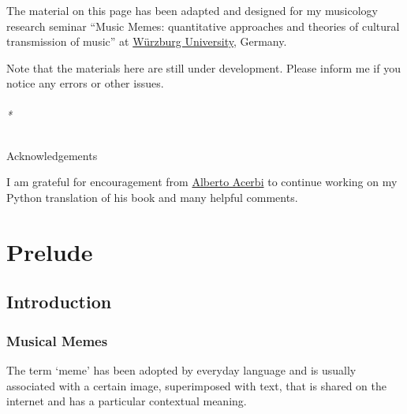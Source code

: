 \documentclass[
  a4paperpaper,
  ,captions=tableheading
]{scrbook}
\let\oldparagraph\paragraph
\renewcommand{\paragraph}[1]{\oldparagraph{#1}\mbox{}}
\begin{document}
\begin{tcolorbox}[enhanced jigsaw, arc=.35mm, colbacktitle=quarto-callout-important-color!10!white, colback=white, breakable, toprule=.15mm, title=\textcolor{quarto-callout-important-color}{\faExclamation}\hspace{0.5em}{Important}, left=2mm, bottomtitle=1mm, toptitle=1mm, leftrule=.75mm, opacitybacktitle=0.6, titlerule=0mm, opacityback=0, rightrule=.15mm, bottomrule=.15mm, coltitle=black, colframe=quarto-callout-important-color-frame]

The material on this page has been adapted and designed for my
musicology research seminar ``Music Memes: quantitative approaches and
theories of cultural transmission of music'' at
\href{https://uni-wuerzburg.de/}{Würzburg University}, Germany.

Note that the materials here are still under development. Please inform
me if you notice any errors or other issues.

\end{tcolorbox}

\hypertarget{acknowledgements}{%
\paragraph*{Acknowledgements}\label{acknowledgements}}

I am grateful for encouragement from
\href{https://twitter.com/acerbialberto}{Alberto Acerbi} to continue
working on my Python translation of his book and many helpful comments.

\part{Prelude}

\hypertarget{introduction}{%
\chapter{Introduction}\label{introduction}}

\hypertarget{musical-memes}{%
\section{Musical Memes}\label{musical-memes}}

The term `meme' has been adopted by everyday language and is usually
associated with a certain image, superimposed with text, that is shared
on the internet and has a particular contextual meaning.
\end{document}

